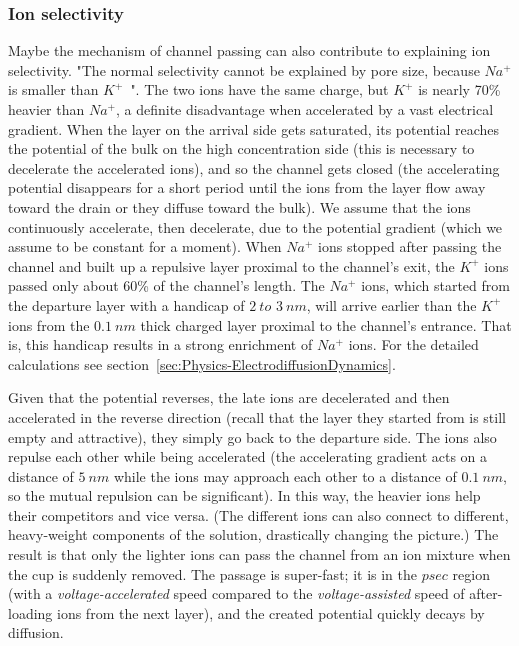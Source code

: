 \subsubsection{Ion selectivity\label{Electrodiffusion_IonSelectivity}}
Maybe the mechanism of channel passing can also contribute to explaining
ion selectivity. "The normal selectivity cannot be explained by
pore size, because $Na^{+}$ is smaller than $K^{+}$~\cite{MolecularBiology:2002}".
The two ions have the same charge, but $K^{+}$ is nearly 70\% heavier
than $Na^{+}$, a definite disadvantage when accelerated by a vast
electrical gradient. When the layer on the arrival side gets saturated,
its potential reaches the potential of the bulk on the high concentration
side (this is necessary to decelerate the accelerated ions), and so
the channel gets closed (the accelerating potential disappears for
a short period until the ions from the layer flow away toward the
drain or they diffuse toward the bulk). We assume that the ions continuously
accelerate, then decelerate, due to the potential gradient (which
we assume to be constant for a moment). When $Na^{+}$ ions stopped
after passing the channel and built up a repulsive layer proximal
to the channel's exit, the $K^{+}$ ions passed only about 60\% of the
channel's length. The $Na^{+}$ ions, which started from the departure
layer with a handicap of $2\ to$ $3\ nm$, will arrive earlier than
the $K^{+}$ ions from the $0.1\ nm$ thick charged layer proximal
to the channel's entrance. That is, this handicap results in a strong
enrichment of $Na^{+}$ ions. For the detailed calculations see section~\ref{sec:Physics-ElectrodiffusionDynamics}.

Given that the potential reverses, the late ions are decelerated and then
accelerated in the reverse direction (recall that the layer they started
from is still empty and attractive), they simply go back to
the departure side. The ions also repulse each other while being accelerated
(the accelerating gradient acts on a distance of $5\ nm$ while the
ions may approach each other to a distance of $0.1\ nm$, so the mutual
repulsion can be significant). In this way, the heavier ions help
their competitors and vice versa. (The different ions can also connect
to different, heavy-weight components of the solution, drastically
changing the picture.) The result is that only the lighter ions can
pass the channel from an ion mixture when the cup is suddenly removed.
The passage is super-fast; it is in the $psec$ region (with a \emph{voltage-accelerated}
speed compared to the \emph{voltage-assisted} speed of after-loading
ions from the next layer), and the created potential quickly decays by diffusion.

